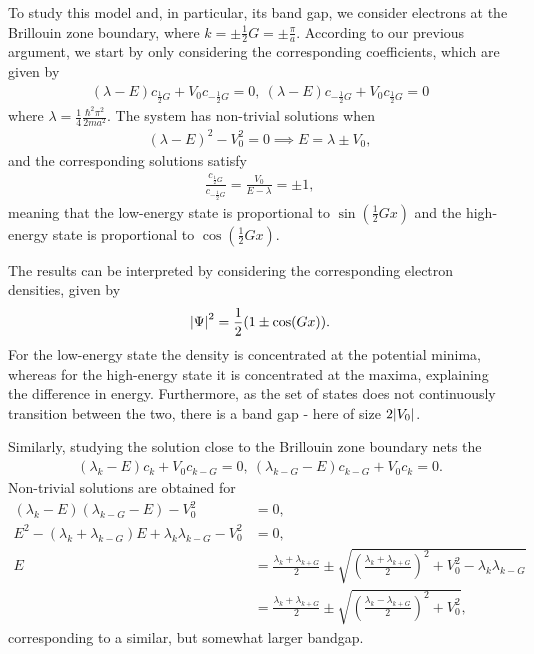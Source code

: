 To study this model and, in particular, its band gap, we consider electrons at the Brillouin zone boundary, where $k = \pm\frac{1}{2}G = \pm\frac{\pi}{a}$. According to our previous argument, we start by only considering the corresponding coefficients, which are given by
\begin{align*}
	\left(\lambda - E\right)c_{\frac{1}{2}G} + V_{0}c_{-\frac{1}{2}G} = 0,\ \left(\lambda - E\right)c_{-\frac{1}{2}G} + V_{0}c_{\frac{1}{2}G} = 0
\end{align*}
where $\lambda = \frac{1}{4}\frac{\hbar^{2}\pi^{2}}{2ma^{2}}$. The system has non-trivial solutions when
\begin{align*}
	\left(\lambda - E\right)^{2} - V_{0}^{2} = 0\implies E = \lambda \pm V_{0},
\end{align*}
and the corresponding solutions satisfy
\begin{align*}
	\frac{c_{\frac{1}{2}G}}{c_{-\frac{1}{2}G}} = \frac{V_{0}}{E - \lambda} = \pm 1,
\end{align*}
meaning that the low-energy state is proportional to $\sin(\frac{1}{2}Gx)$ and the high-energy state is proportional to $\cos(\frac{1}{2}Gx)$.

The results can be interpreted by considering the corresponding electron densities, given by
\begin{align*}
	\abs{\Psi}^{2} = \frac{1}{2}(1 \pm \cos(Gx)).
\end{align*}
For the low-energy state the density is concentrated at the potential minima, whereas for the high-energy state it is concentrated at the maxima, explaining the difference in energy. Furthermore, as the set of states does not continuously transition between the two, there is a band gap - here of size $2\abs{V_{0}}$.

Similarly, studying the solution close to the Brillouin zone boundary nets the
\begin{align*}
	\left(\lambda_{k} - E\right)c_{k} + V_{0}c_{k - G} = 0,\ \left(\lambda_{k - G} - E\right)c_{k - G} + V_{0}c_{k} = 0.
\end{align*}
Non-trivial solutions are obtained for
\begin{align*}
	\left(\lambda_{k} - E\right)\left(\lambda_{k - G} - E\right) - V_{0}^{2} &= 0, \\
	E^{2} - \left(\lambda_{k} + \lambda_{k - G}\right)E + \lambda_{k}\lambda_{k - G} - V_{0}^{2} &= 0, \\
	E                                                                        &= \frac{\lambda_{k} + \lambda_{k + G}}{2} \pm\sqrt{\left(\frac{\lambda_{k} + \lambda_{k + G}}{2}\right)^{2} + V_{0}^{2} - \lambda_{k}\lambda_{k - G}} \\
	                                                                         &= \frac{\lambda_{k} + \lambda_{k + G}}{2} \pm\sqrt{\left(\frac{\lambda_{k} - \lambda_{k + G}}{2}\right)^{2} + V_{0}^{2}},
\end{align*}
corresponding to a similar, but somewhat larger bandgap.


